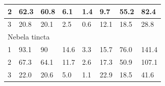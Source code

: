 \documentclass[12pt, a4paper]{article}
\begin{document}
\begin{table}[h]
{\begin{tabular}{|llllllll|}
\multicolumn{1}{|l|}{2}                                         & \multicolumn{1}{l|}{62.3}                        & \multicolumn{1}{l|}{60.8}         & \multicolumn{1}{l|}{6.1}                         & \multicolumn{1}{l|}{1.4}                 & \multicolumn{1}{l|}{9.7}                      & \multicolumn{1}{l|}{55.2}         & 82.4                               \\ \hline
\multicolumn{1}{|l|}{3}                                         & \multicolumn{1}{l|}{20.8}                        & \multicolumn{1}{l|}{20.1}         & \multicolumn{1}{l|}{2.5}                         & \multicolumn{1}{l|}{0.6}                 & \multicolumn{1}{l|}{12.1}                     & \multicolumn{1}{l|}{18.5}         & 28.8                               \\ \hline
\multicolumn{8}{|l|}{Nebela tincta}                                                                                                                                                                                                                                                                                                                                           \\ \hline
\multicolumn{1}{|l|}{1}                                         & \multicolumn{1}{l|}{93.1}                        & \multicolumn{1}{l|}{90}           & \multicolumn{1}{l|}{14.6}                        & \multicolumn{1}{l|}{3.3}                 & \multicolumn{1}{l|}{15.7}                     & \multicolumn{1}{l|}{76.0}         & 141.4                              \\ \hline
\multicolumn{1}{|l|}{2}                                         & \multicolumn{1}{l|}{67.3}                        & \multicolumn{1}{l|}{64.1}         & \multicolumn{1}{l|}{11.7}                        & \multicolumn{1}{l|}{2.6}                 & \multicolumn{1}{l|}{17.3}                     & \multicolumn{1}{l|}{50.9}         & 107.1                              \\ \hline
\multicolumn{1}{|l|}{3}                                         & \multicolumn{1}{l|}{22.0}                        & \multicolumn{1}{l|}{20.6}         & \multicolumn{1}{l|}{5.0}                         & \multicolumn{1}{l|}{1.1}                 & \multicolumn{1}{l|}{22.9}                     & \multicolumn{1}{l|}{18.5}         & 41.6                               \\ \hline
\end{tabular}%
}
\end{table}
\end{document}
